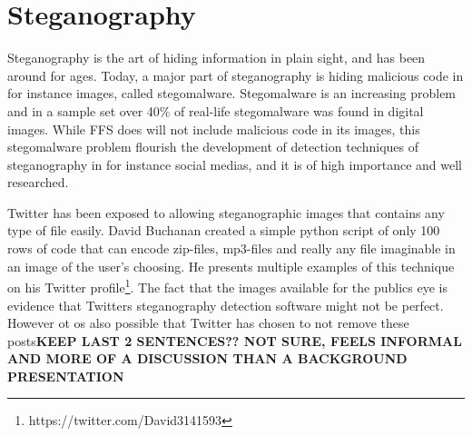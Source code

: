 \section{Steganography}
Steganography is the art of hiding information in plain sight, and has been around for ages. Today, a major part of steganography is hiding malicious code in for instance images, called stegomalware. Stegomalware is an increasing problem and in a sample set over 40\% of real-life stegomalware was found in digital images\cite{SIMARGLStegwarePrimer}. While FFS does will not include malicious code in its images, this stegomalware problem flourish the development of detection techniques of steganography in for instance social medias, and it is of high importance and well researched. 

Twitter has been exposed to allowing steganographic images that contains any type of file easily\cite{TwitterImagesCan}. David Buchanan created a simple python script of only 100 rows of code that can encode zip-files, mp3-files and really any file imaginable in an image of the user's choosing\cite{buchananTweetablepolyglotpng2022}. He presents multiple examples of this technique on his Twitter profile\footnote{https://twitter.com/David3141593}. The fact that the images available for the publics eye is evidence that Twitters steganography detection software might not be perfect. However ot os also possible that Twitter has chosen to not remove these posts\textbf{KEEP LAST 2 SENTENCES?? NOT SURE, FEELS INFORMAL AND MORE OF A DISCUSSION THAN A BACKGROUND PRESENTATION}
